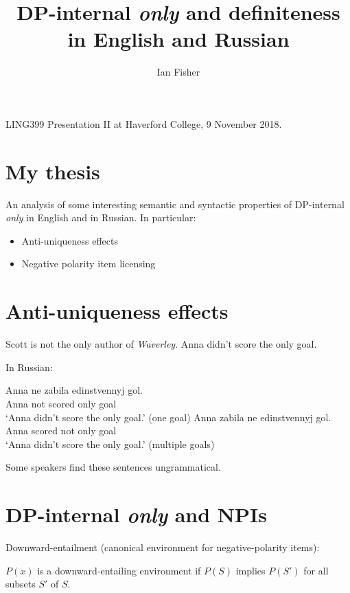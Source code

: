 \documentclass{article}
\title{DP-internal \textit{only} and definiteness in English and Russian}
\author{Ian Fisher}
\date{}
\begin{document}
\maketitle

\noindent LING399 Presentation II at Haverford College, 9 November 2018.

\section{My thesis}
An analysis of some interesting semantic and syntactic properties of DP-internal \textit{only} in English and in Russian. In particular:

\begin{itemize}
	\item Anti-uniqueness effects \citep{cb2015}
	\item Negative polarity item licensing
\end{itemize}


\section{Anti-uniqueness effects}
\begin{exe}
	\ex Scott is not the only author of \textit{Waverley}.
	\ex Anna didn't score the only goal.
\end{exe}

\noindent In Russian:
\begin{exe}
	\ex \gll Anna ne zabila edinstvennyj gol.\\
	Anna not scored only goal\\
	\glt `Anna didn't score the only goal.' (one goal)
	\ex \gll Anna zabila ne edinstvennyj gol.\\
	Anna scored not only goal\\
	\glt `Anna didn't score the only goal.' (multiple goals)
\end{exe}

\noindent Some speakers find these sentences ungrammatical.


\section{DP-internal \textit{only} and NPIs}
Downward-entailment (canonical environment for negative-polarity items):

\begin{exe}
	\ex $P(x)$ is a downward-entailing environment if $P(S)$ implies $P(S')$ for all subsets $S'$ of $S$.
\end{exe}
\end{document}
